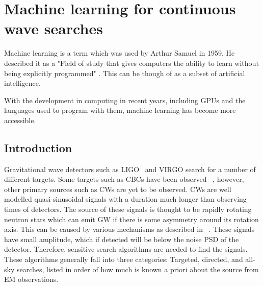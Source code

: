 \chapter{\label{cnn} Machine learning for continuous wave searches}


Machine learning is a term which was used by Arthur Samuel in 1959. 
He described it as a "Field of study that gives computers the ability to learn without being explicitly programmed" \citep{}.
This can be though of as a subset of artificial intelligence. 

With the development in computing in recent years, including GPUs and the languages used to program with them, machine learning has become more accessible. 


\section{\label{machine:intro} Introduction}

%
Gravitational wave detectors such as \ac{LIGO}~\cite{abbott2009LIGOLaser,aasi2015AdvancedLIGO} and VIRGO
\cite{acernese2015AdvancedVirgo,acernese2008StatusVirgo} search for a number of different targets. 
Some targets such as \acp{CBC} have been observed ~\cite{abbott2017GW170817Observation,abbott2017GW170814ThreeDetector,abbott2016ObservationGravitational},
however, other primary sources such as \acp{CW} are yet to be observed.
\acp{CW} are well modelled quasi-sinusoidal signals with a
duration much longer than observing times of detectors.
The source of these signals is thought to be rapidly rotating neutron stars which can emit \ac{GW} if there is some asymmetry around its rotation axis. 
This can be caused by various mechanisms as described in ~\cite{prix2009GravitationalWaves}. 
These signals have small amplitude, which if detected will be below the noise \ac{PSD} of the detector.
Therefore, sensitive search algorithms are needed to find the signals. 
These algorithms generally fall into three categories: Targeted,
directed, and all-sky searches, listed in order of how much is known a priori
about the source from \ac{EM} observations. 

